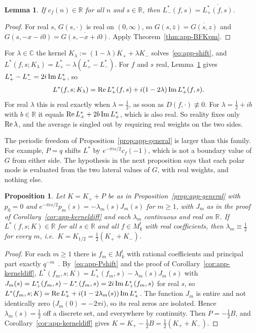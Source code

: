 \documentclass[11pt]{article}
\newtheorem{lemma}[theorem]{Lemma}
\newtheorem{proposition}[theorem]{Proposition}
\newcommand{\CC}{\mathbb{C}}
\newcommand{\RR}{\mathbb{R}}
\begin{document}
\begin{lemma}\label{lem:app-real}
If $c_f(n)\in\RR$ for all $n$ and $s\in\RR$, then $L^*_-(f,s)=\overline{L^*_+(f,s)}$.
\end{lemma}

\begin{proof}
For real $s$, $G(s,\cdot)$ is real on $(0,\infty)$, so $G(s,\bar z)=\overline{G(s,z)}$ and
$G(s,-x-i0)=\overline{G(s,-x+i0)}$. Apply Theorem~\ref{thm:app-BFKpm}.
\end{proof}

For $\lambda\in\CC$ the kernel $K_\lambda:=(1-\lambda)K_++\lambda K_-$ solves~\eqref{eq:app-shift},
and $L^*(f,s;K_\lambda)=L^*_+-\lambda(L^*_+-L^*_-)$. For $f$ and $s$ real,
Lemma~\ref{lem:app-real} gives $L^*_+-L^*_-=2i\,{\rm Im}\,L^*_+$, so
\[
L^*(f,s;K_\lambda)={\rm Re}\,L^*_+(f,s)+i(1-2\lambda)\,{\rm Im}\,L^*_+(f,s).
\]
For real $\lambda$ this is real exactly when $\lambda=\frac12$, as soon as $D(f,\cdot)\not\equiv0$.
For $\lambda=\frac12+ib$ with $b\in\RR$ it equals ${\rm Re}\,L^*_++2b\,{\rm Im}\,L^*_+$, which is also
real. So reality fixes only ${\rm Re}\,\lambda$, and the average is singled out by requiring real
weights on the two sides.

The periodic freedom of Proposition~\ref{prop:app-general} is larger than this family. For example,
$P=q$ shifts $L^*$ by $e^{-\pi is/2}c_f(-1)$, which is not a boundary value of $G$ from either side.
The hypothesis in the next proposition says that each polar mode is evaluated from the two lateral
values of $G$, with real weights, and nothing else.

\begin{proposition}\label{prop:app-unique}
Let $K=K_++P$ be as in Proposition~\ref{prop:app-general} with $p_0=0$ and
$e^{-\pi is/2}p_m(s)=-\lambda_m(s)J_m(s)$ for $m\ge1$, with $J_m$ as in the proof of
Corollary~\ref{cor:app-kerneldiff} and each $\lambda_m$ continuous and real on $\RR$. If
$L^*(f,s;K)\in\RR$ for all $s\in\RR$ and all $f\in M^!_k$ with real coefficients, then
$\lambda_m\equiv\frac12$ for every $m$, i.e.\ $K=K_{1/2}=\frac12(K_++K_-)$.
\end{proposition}

\begin{proof}
For each $m\ge1$ there is $f_m\in M^!_k$ with rational coefficients and principal part exactly
$q^{-m}$~\cite{DukeJenkins}. By~\eqref{eq:app-Pshift} and the proof of
Corollary~\ref{cor:app-kerneldiff},
$L^*(f_m,s;K)=L^*_+(f_m,s)-\lambda_m(s)J_m(s)$ with $J_m(s)=L^*_+(f_m,s)-L^*_-(f_m,s)=2i\,{\rm Im}\,L^*_+(f_m,s)$
for real $s$, so $L^*(f_m,s;K)={\rm Re}\,L^*_++i(1-2\lambda_m(s))\,{\rm Im}\,L^*_+$. The function
$J_m$ is entire and not identically zero ($J_m(0)=-2\pi i$), so its real zeros are isolated. Hence
$\lambda_m(s)=\frac12$ off a discrete set, and everywhere by continuity. Then $P=-\frac12B$, and
Corollary~\ref{cor:app-kerneldiff} gives $K=K_+-\frac12B=\frac12(K_++K_-)$.
\end{proof}
\end{document}
